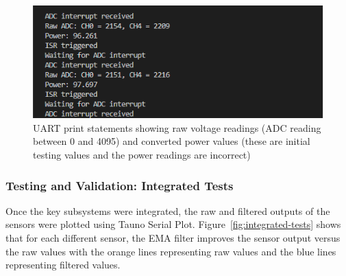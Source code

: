 \documentclass[a4paper, 11pt, titlepage]{article}
\begin{document}
\begin{figure}[H]
    \centering
    \includegraphics[width=0.7\linewidth]{images/power_uart.png}
    \caption{UART print statements showing raw voltage readings (ADC reading between 0 and 4095) and converted power values (these are initial testing values and the power readings are incorrect)}
    \label{fig:power_output}
\end{figure}

\subsubsection{Testing and Validation: Integrated Tests}

Once the key subsystems were integrated, the raw and filtered outputs of the sensors were plotted using Tauno Serial Plot\parencite{serialplot}. Figure~\ref{fig:integrated-tests} shows that for each different sensor, the EMA filter improves the sensor output versus the raw values with the orange lines representing raw values and the blue lines representing filtered values.
\end{document}
